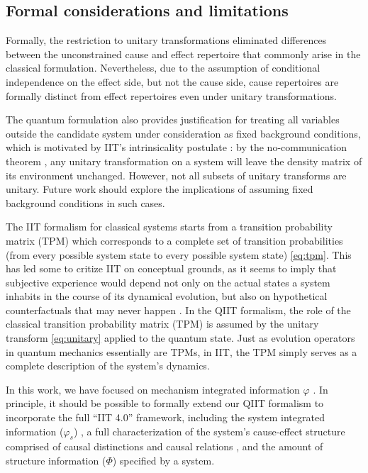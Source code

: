 \documentclass[preprints, article, accept, pdftex, moreauthors, letterpaper]{Definitions/mdpi}
\renewcommand{\=}[1]{\stackrel{#1}{=}} %
\renewcommand{\*}{\otimes}%
\begin{document}
\subsection{Formal considerations and limitations}
\label{limitations}
Formally, the restriction to unitary transformations eliminated differences between the unconstrained cause and effect repertoire that commonly arise in the classical formulation. Nevertheless, due to the assumption of conditional independence on the effect side, but not the cause side, cause repertoires are formally distinct from effect repertoires even under unitary transformations. 

The quantum formulation also provides justification for treating all variables outside the candidate system under consideration as fixed background conditions, which is motivated by IIT's intrinsicality postulate \cite{Albantakis2019, Oizumi2014}: by the no-communication theorem \cite{NielsonChuang2011}, any unitary transformation on a system will leave the density matrix of its environment unchanged. 
However, not all subsets of unitary transforms are unitary. Future work should explore the implications of assuming fixed background conditions in such cases.

The IIT formalism for classical systems starts from a transition probability matrix (TPM) which corresponds to a complete set of transition probabilities (from every possible system state to every possible system state) \eqref{eq:tpm}. This has led some to critize IIT on conceptual grounds, as it seems to imply that subjective experience would depend not only on the actual states a system inhabits in the course of its dynamical evolution, but also on hypothetical counterfactuals that may never happen \cite{seth2021being}. 
In the QIIT formalism, the role of the classical transition probability matrix (TPM) is assumed by the unitary transform \eqref{eq:unitary} applied to the quantum state. 
Just as evolution operators in quantum mechanics essentially are TPMs, in IIT, the TPM simply serves as a complete description of the system's dynamics. 

In this work, we have focused on mechanism integrated information $\varphi$ \cite{Barbosa2021}. In principle, it should be possible to formally extend our QIIT formalism to incorporate the full ``IIT 4.0'' framework, including the system integrated information ($\varphi_s$) \cite{Marshall2022}, a full characterization of the system's cause-effect structure comprised of causal distinctions and causal relations \cite{Haun2019}, and the amount of structure information ($\varPhi$) specified by a system. 
\end{document}
